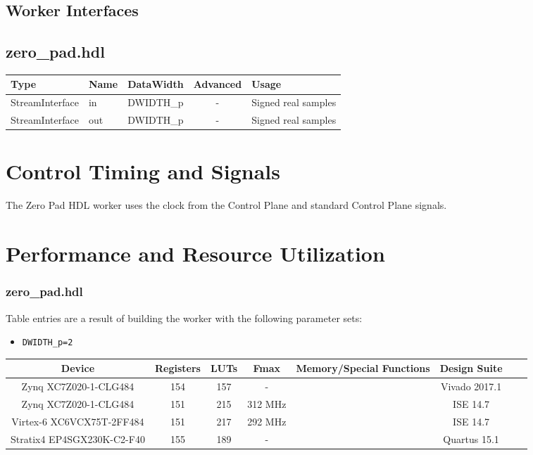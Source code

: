 \documentclass{article}
\def\comp{zero\_pad}
\def\Comp{Zero Pad}
\begin{document}
\begin{landscape}
	\section*{Worker Interfaces}
	\subsection*{\comp.hdl}
	\begin{scriptsize}
		\begin{tabular}{|M{2cm}|M{1.5cm}|c|c|p{12cm}|}
			\hline
			Type            & Name & DataWidth 		& Advanced  & Usage                 \\
			\hline
			StreamInterface & in   & DWIDTH\_p		& - 		& Signed real samples 	\\
			\hline
			StreamInterface & out  & DWIDTH\_p		& -			& Signed real samples 	\\
			\hline
		\end{tabular}
	\end{scriptsize}
\end{landscape}

\section*{Control Timing and Signals}
\begin{flushleft}
	The \Comp{} HDL worker uses the clock from the Control Plane and standard Control Plane signals.\\
\end{flushleft}

\section*{Performance and Resource Utilization}
\subsubsection*{\comp.hdl}
Table entries are a result of building the worker with the following parameter sets:\
\begin{itemize}
  \item \verb+DWIDTH_p=2+
\end{itemize}
\begin{scriptsize}
	\begin{tabular}{|c|c|c|c|c|c|c|c|}
    \hline
    \rowcolor{blue}
    Device                    	& Registers & LUTs & Fmax    	& Memory/Special Functions 	& Design Suite \\
    \hline
	Zynq XC7Z020-1-CLG484     	& 154       & 157  & -			& 							& Vivado 2017.1\\
	\hline
	Zynq XC7Z020-1-CLG484     	& 151		& 215  & 312 MHz  	& 							& ISE 14.7     \\
	\hline
	Virtex-6 XC6VCX75T-2FF484 	& 151       & 217  & 292 MHz  	&  							& ISE 14.7     \\
	\hline
	Stratix4 EP4SGX230K-C2-F40 	& 155       & 189  & -			& 							& Quartus 15.1 \\
	\hline
	\end{tabular}
\end{scriptsize}
\end{document}
